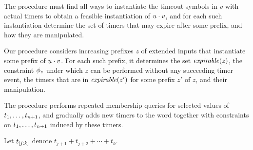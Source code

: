
The procedure must find all ways to instantiate the timeout symbols in $v$
with actual timers to obtain a feasible instantiation of $u\cdot v$, and for
each such instantiation determine the set of timers that may expire after some
prefix, and how they are manipulated.

Our procedure considers increasing prefixes $z$ of extended inputs that
instantiate some prefix of $u \cdot v$. For each such prefix, it
determines the set $\mathit{expirable}(z)$, the constraint $\phi_{z}$
under which $z$ can be performed without any succeeding timer event, 
the timers that are in $\mathit{expirable}(z')$ for some prefix $z'$ of $z$, and
their manipulation.

The procedure performs repeated membership queries for selected values
of ${t}_1 , \ldots , {t}_{n+1}$, and gradually adds new timers to the word together
with constraints on ${t}_1 , \ldots , {t}_{n+1}$ induced by these timers.

Let $t_{[j:k]}$ denote $t_{j+1} + t_{j+2} + \cdots + t_k$.



